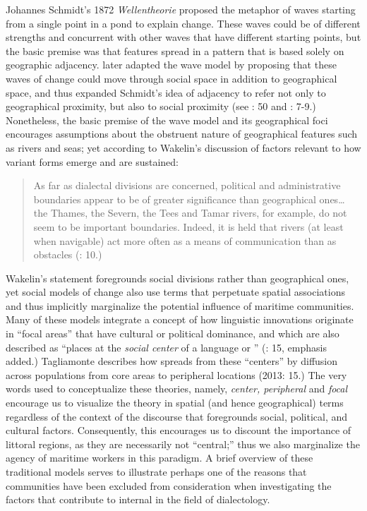 Johannes Schmidt’s 1872 \textit{Wellentheorie} proposed the metaphor of waves starting from a single point in a pond to explain  change. These waves could be of different strengths and concurrent with other waves that have different starting points, but the basic premise was that  features spread in a pattern that is based solely on geographic adjacency. \citet{BaileyEtAl1993} later adapted the wave model by proposing that these waves of change could move through social space in addition to geographical space, and thus expanded Schmidt’s idea of adjacency to refer not only to geographical proximity, but also to social proximity (see \citealt{Petyt1980}: 50 and \citealt{AuerEtAl2005}: 7-9.) Nonetheless, the basic premise of the wave model and its geographical foci encourages assumptions about the obstruent nature of geographical features such as rivers and seas; yet according to Wakelin’s discussion of factors relevant to how variant  forms emerge and are sustained: 

\begin{quotation}
As far as dialectal divisions are concerned, political and administrative boundaries appear to be of greater significance than geographical ones… the Thames, the Severn, the Tees and Tamar rivers, for example, do not seem to be important  boundaries. Indeed, it is held that rivers (at least when navigable) act more often as a means of communication than as obstacles (\citealt{Wakelin1977}: 10.)\end{quotation}

Wakelin’s statement foregrounds social divisions rather than geographical ones, yet social models of  change also use terms that perpetuate spatial associations and thus implicitly marginalize the potential influence of maritime communities. Many of these models integrate a concept of how linguistic innovations originate in “focal areas” that have cultural or political dominance, and which are also described as “places at the \textit{social center} of a language or ” (\citealt{Tagliamonte2013}: 15, emphasis added.) Tagliamonte describes how  spreads from these “centers” by diffusion across populations from core areas to peripheral locations (2013: 15.) The very words used to conceptualize these theories, namely, \textit{center, peripheral} and \textit{focal} encourage us to visualize the theory in spatial (and hence geographical) terms regardless of the context of the discourse that foregrounds social, political, and cultural factors. Consequently, this encourages us to discount the importance of littoral regions, as they are necessarily not “central;” thus we also marginalize the agency of maritime workers in this paradigm. A brief overview of these traditional models serves to illustrate perhaps one of the reasons that  communities have been excluded from consideration when investigating the factors that contribute to internal  in the field of dialectology. 

